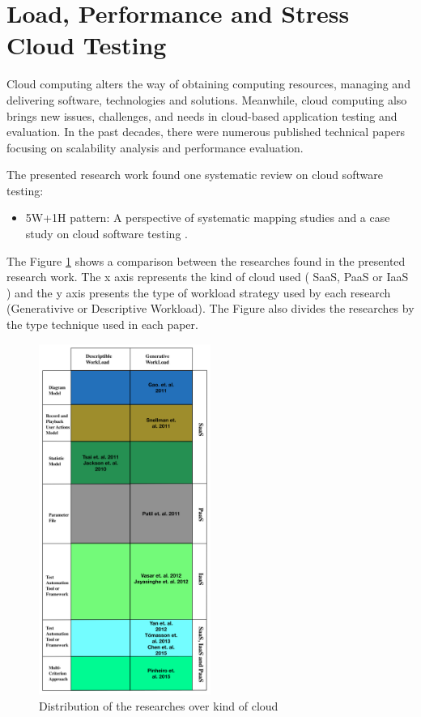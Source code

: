 \section{Load, Performance and Stress Cloud Testing}


Cloud computing alters the way of obtaining computing resources, managing and delivering software, technologies and solutions. Meanwhile, cloud computing also brings new issues, challenges, and needs in cloud-based application testing and evaluation. In the past decades, there were numerous published technical papers focusing on scalability analysis and performance evaluation. 

The presented research work found one systematic review on cloud software testing:


\begin{itemize}
\item 5W+1H pattern: A perspective of systematic mapping studies and a case study on cloud software testing \cite{Jia2015}.
\end{itemize}

The Figure \ref{fig:surveycloud}  shows a comparison between the  researches found in the presented research work. The x axis represents the kind of cloud used ( SaaS, PaaS  or IaaS )  and the y axis presents the type of workload strategy used by each research (Generativive or Descriptive Workload). The Figure also divides the researches by the type technique used in each paper.


\begin{figure}[!ht]
\centering
\includegraphics[width=0.5\textwidth]{./images/SurveyFiguraCloud3.png}
\caption{Distribution of the researches over kind of cloud}
\label{fig:surveycloud}
\end{figure}




